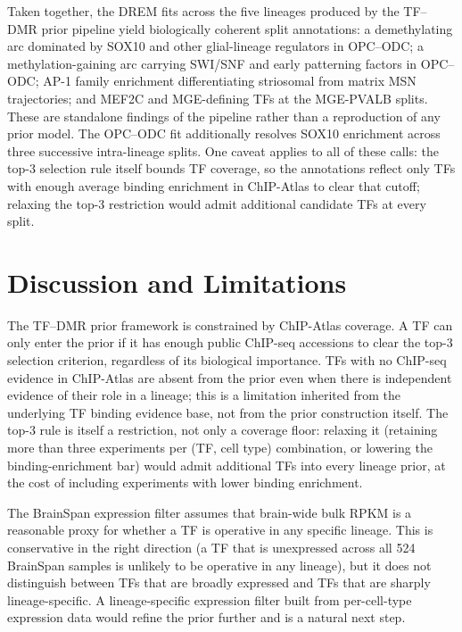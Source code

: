\documentclass[sigconf,nonacm]{acmart}
\begin{document}
Taken together, the DREM fits across the five lineages produced by
the TF--DMR prior pipeline yield biologically coherent split
annotations: a demethylating arc dominated by SOX10 and other
glial-lineage regulators in OPC--ODC; a methylation-gaining arc
carrying SWI/SNF and early patterning factors in OPC--ODC; AP-1
family enrichment differentiating striosomal from matrix MSN
trajectories; and MEF2C and MGE-defining TFs at the MGE-PVALB
splits. These are standalone findings of the pipeline rather than a
reproduction of any prior model. The OPC--ODC fit additionally
resolves SOX10 enrichment across three successive intra-lineage
splits. One caveat applies to
all of these calls: the top-3 selection rule itself bounds TF
coverage, so the annotations reflect only TFs with enough average
binding enrichment in ChIP-Atlas to clear that cutoff; relaxing
the top-3 restriction would admit additional candidate TFs at every
split.

\section{Discussion and Limitations}
\label{sec:discussion}

The TF--DMR prior framework is constrained by ChIP-Atlas coverage.
A TF can only enter the prior if it has enough public ChIP-seq
accessions to clear the top-3 selection criterion, regardless of
its biological importance. TFs with no ChIP-seq evidence in
ChIP-Atlas are absent from the prior even when there is independent
evidence of their role in a lineage; this is a limitation inherited
from the underlying TF binding evidence base, not from the prior
construction itself. The top-3 rule is itself a restriction, not
only a coverage floor: relaxing it (retaining more than three
experiments per (TF, cell type) combination, or lowering the
binding-enrichment bar) would admit additional TFs into every
lineage prior, at the cost of including experiments with lower
binding enrichment.

The BrainSpan expression filter assumes that brain-wide bulk RPKM is
a reasonable proxy for whether a TF is operative in any specific
lineage. This is conservative in the right direction (a TF that is
unexpressed across all 524 BrainSpan samples is unlikely to be
operative in any lineage), but it does not distinguish between TFs
that are broadly expressed and TFs that are sharply lineage-specific.
A lineage-specific expression filter built from per-cell-type
expression data would refine the prior further and is a natural next
step.
\end{document}
